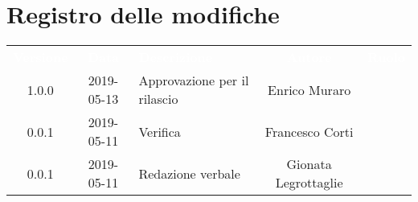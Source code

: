 \section*{Registro delle modifiche}
{
	\renewcommand{\arraystretch}{1.5}
	\centering
	\begin{longtable}{ c c  C{4cm}  c  c }
		
		\textcolor{white}{\textbf{Versione}} & \textcolor{white}{\textbf{Data}} & \textcolor{white}{\textbf{Descrizione}} & \textcolor{white}{\textbf{Autore}} & \textcolor{white}{\textbf{Ruolo}}\\
		1.0.0 & 2019-05-13 & Approvazione per il rilascio & Enrico Muraro & \Res{}\\
		0.0.1 & 2019-05-11 & Verifica & Francesco Corti & \ver{}\\
		0.0.1 & 2019-05-11 & Redazione verbale & Gionata Legrottaglie & \reda{}\\
		
		
	\end{longtable}
	
}